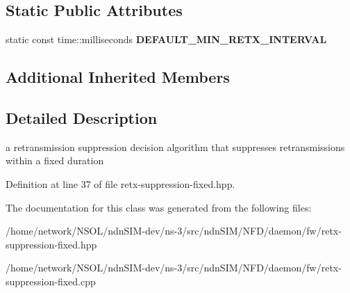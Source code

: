 \subsection*{Static Public Attributes}
\begin{DoxyCompactItemize}
\item 
static const time\+::milliseconds {\bfseries D\+E\+F\+A\+U\+L\+T\+\_\+\+M\+I\+N\+\_\+\+R\+E\+T\+X\+\_\+\+I\+N\+T\+E\+R\+V\+AL}\hypertarget{classnfd_1_1fw_1_1RetxSuppressionFixed_a3ad1da4d03fcb282507de13935ff3b78}{}\label{classnfd_1_1fw_1_1RetxSuppressionFixed_a3ad1da4d03fcb282507de13935ff3b78}

\end{DoxyCompactItemize}
\subsection*{Additional Inherited Members}


\subsection{Detailed Description}
a retransmission suppression decision algorithm that suppresses retransmissions within a fixed duration 

Definition at line 37 of file retx-\/suppression-\/fixed.\+hpp.



The documentation for this class was generated from the following files\+:\begin{DoxyCompactItemize}
\item 
/home/network/\+N\+S\+O\+L/ndn\+S\+I\+M-\/dev/ns-\/3/src/ndn\+S\+I\+M/\+N\+F\+D/daemon/fw/retx-\/suppression-\/fixed.\+hpp\item 
/home/network/\+N\+S\+O\+L/ndn\+S\+I\+M-\/dev/ns-\/3/src/ndn\+S\+I\+M/\+N\+F\+D/daemon/fw/retx-\/suppression-\/fixed.\+cpp\end{DoxyCompactItemize}
